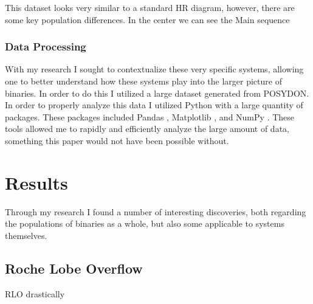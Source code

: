 \documentclass[12pt, a4paper]{article}
\begin{document}
        This dataset looks very similar to a standard HR diagram, however, there are some key population differences. In the center we can see the Main sequence
        \subsubsection{Data Processing}
            With my research I sought to contextualize these very specific systems, allowing one to better understand how these systems play into the larger picture of binaries. In order to do this I utilized a large dataset generated from POSYDON. In order to properly analyze this data I utilized Python with a large quantity of packages. These packages included Pandas \cite{reback2020pandas}, Matplotlib \cite{Matplotlib}, and NumPy \cite{harris2020array}. These tools allowed me to rapidly and efficiently analyze the large amount of data, something this paper would not have been possible without.

    \section{\centering Results}
        Through my research I found a number of interesting discoveries, both regarding the populations of binaries as a whole, but also some applicable to systems themselves.
  
        \subsection{\centering Roche Lobe Overflow}
            RLO drastically 



\end{document}
